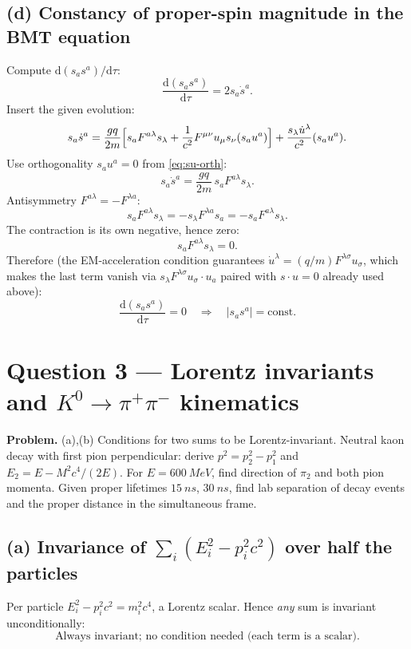 \documentclass[11pt]{article}
\newcommand{\de}{\mathrm{d}}
\begin{document}
\subsection*{(d) Constancy of proper-spin magnitude in the BMT equation}

Compute $\de(s_a s^a)/\de\tau$:
\[ \frac{\de(s_a s^a)}{\de\tau} = 2 s_a\dot s^a. \]
Insert the given evolution:
\[ s_a\dot s^a = \frac{gq}{2m}\Bigl[s_a F^{a\lambda}s_\lambda + \frac{1}{c^2}F^{\mu\nu}u_\mu s_\nu (s_a u^a)\Bigr] + \frac{s_\lambda\dot u^\lambda}{c^2}(s_a u^a). \]
Use orthogonality $s_a u^a=0$ from \eqref{eq:su-orth}:
\[ s_a\dot s^a = \frac{gq}{2m}\,s_a F^{a\lambda}s_\lambda. \]
Antisymmetry $F^{a\lambda}=-F^{\lambda a}$:
\[ s_a F^{a\lambda}s_\lambda = -s_\lambda F^{\lambda a} s_a = -s_a F^{a\lambda}s_\lambda. \]
The contraction is its own negative, hence zero:
\[ s_a F^{a\lambda}s_\lambda = 0. \]
Therefore (the EM-acceleration condition guarantees $\dot u^\lambda=(q/m)F^{\lambda\sigma}u_\sigma$, which makes the last term vanish via $s_\lambda F^{\lambda\sigma}u_\sigma\cdot u_a$ paired with $s\cdot u=0$ already used above):
\begin{equation}
\boxed{\;\frac{\de(s_a s^a)}{\de\tau} = 0\quad\Rightarrow\quad |s_a s^a|=\text{const}.\;}
\label{eq:spin-mag}
\end{equation}

\section*{Question 3 --- Lorentz invariants and $K^0\to\pi^+\pi^-$ kinematics}

\textbf{Problem.} (a),(b) Conditions for two sums to be Lorentz-invariant. Neutral kaon decay with first pion perpendicular: derive $p^2=p_2^2-p_1^2$ and $E_2=E-M^2c^4/(2E)$. For $E=\SI{600}{MeV}$, find direction of $\pi_2$ and both pion momenta. Given proper lifetimes $\SI{15}{ns}$, $\SI{30}{ns}$, find lab separation of decay events and the proper distance in the simultaneous frame.

\subsection*{(a) Invariance of $\sum_i(E_i^2-p_i^2 c^2)$ over half the particles}

Per particle $E_i^2-p_i^2 c^2=m_i^2 c^4$, a Lorentz scalar.
Hence \emph{any} sum is invariant unconditionally:
\begin{equation}
\boxed{\;\text{Always invariant; no condition needed (each term is a scalar).}\;}
\end{equation}
\end{document}
